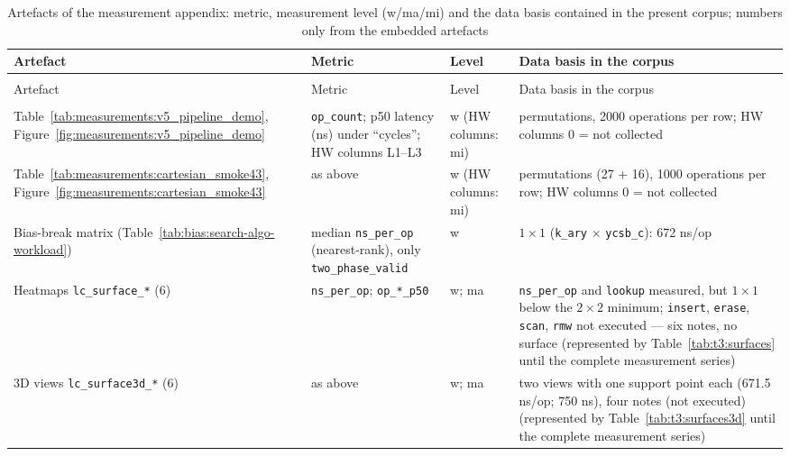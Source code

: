 \begin{footnotesize}
\begin{longtable}{@{}>{\raggedright\arraybackslash}p{4.6cm}>{\raggedright\arraybackslash}p{3.4cm}>{\raggedright\arraybackslash}p{1.1cm}>{\raggedright\arraybackslash}p{5.3cm}@{}}
\caption{Artefacts of the measurement appendix: metric, measurement level (w/ma/mi) and the data
basis contained in the present corpus; numbers only from the embedded artefacts}\label{tab:measurements:artefakt-ebenen}\\
\toprule
Artefact & Metric & Level & Data basis in the corpus \\
\midrule
\endfirsthead%
\multicolumn{4}{@{}l}{\tablename\ \thetable{} --- continued}\\
\toprule
Artefact & Metric & Level & Data basis in the corpus \\
\midrule
\endhead%
\midrule
\multicolumn{4}{r@{}}{continued on next page}\\
\endfoot%
\bottomrule
\endlastfoot%
Table~\ref{tab:measurements:v5_pipeline_demo}, Figure~\ref{fig:measurements:v5_pipeline_demo} & \texttt{op\_count}; p50 latency (ns) under \enquote{cycles}; HW columns L1--L3 & w (HW columns: mi) & 6 permutations, 2000 operations per row; HW columns 0 = not collected \\
Table~\ref{tab:measurements:cartesian_smoke43}, Figure~\ref{fig:measurements:cartesian_smoke43} & as above & w (HW columns: mi) & 43 permutations (27 + 16), 1000 operations per row; HW columns 0 = not collected \\
Bias-break matrix (Table~\ref{tab:bias:search-algo-workload}) & median \texttt{ns\_per\_op} (nearest-rank), only \texttt{two\_phase\_valid} & w & $1{\times}1$ (\texttt{k\_ary} $\times$ \texttt{ycsb\_c}): 672 ns/op \\
Heatmaps \texttt{lc\_\allowbreak{}surface\_*} (6) & \texttt{ns\_per\_op}; \texttt{op\_*\_p50} & w; ma &
  \texttt{ns\_per\_op} and \texttt{lookup} measured, but $1{\times}1$ below the $2{\times}2$ minimum;
  \texttt{insert}, \texttt{erase}, \texttt{scan}, \texttt{rmw} not executed --- six notes, no surface
  \ifPlatzhalterAlsTabelle{}(represented by Table~\ref{tab:t3:surfaces} until the complete
  measurement series)\fi \\
3D views \texttt{lc\_\allowbreak{}surface3d\_*} (6) & as above & w; ma & two views with one support point
  each (671.5 ns/op; 750 ns), four notes (not executed)
  \ifPlatzhalterAlsTabelle{}(represented by Table~\ref{tab:t3:surfaces3d} until the complete
  measurement series)\fi \\

\end{longtable}
\end{footnotesize}

